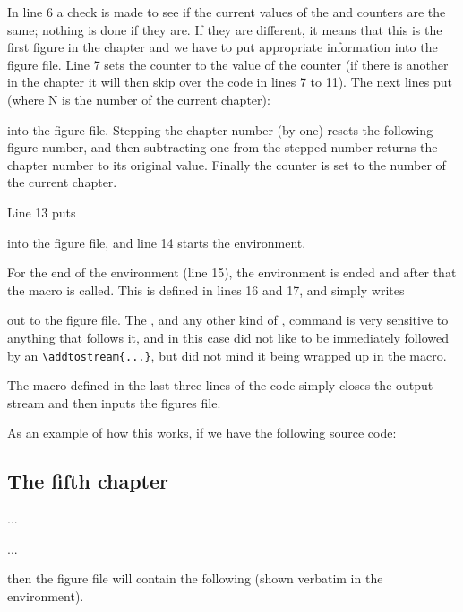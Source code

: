 {{{{    In line 6 a check is made to see if the current values of the 
 and  counters are the same; 
nothing is done if they are. If they are
different, it means that this is the first figure in the chapter and we have
to put appropriate information into the figure file. Line 7 sets the
 counter to the value of the  counter 
(if there is another  in the chapter it will then 
skip over the code in lines 7 to 11).
The next lines put (where N is the number of the current chapter):
\begin{lcode}
\addtocounter{chapter}{-1}
\setcounter{pseudo}{N}
\end{lcode}
into the figure file. Stepping the chapter number (by one) resets the 
following figure number, and then subtracting one from the stepped number
returns the chapter number to its original value. 
Finally the counter  is set to the number of the 
current chapter.

    Line 13 puts
\begin{lcode}
\begin{figure}
\end{lcode}
into the figure file, and line 14 starts the 
 environment.

    For the end of the  environment (line 15), the 
 environment is ended and after that the 
\cmd{\finishwritefigure} macro
is called. This is defined in lines 16 and 17, and simply writes
\begin{lcode}
\end{figure}
\end{lcode}
out to the figure file. The \cmd{\endwriteverbatim}, and any other kind of
, command is very sensitive to anything that follows it,
and in this case did not like to be immediately followed by an
\verb?\addtostream{...}?, but did not mind it being wrapped up in 
the \cmd{\finishwritefigure} macro.

    The \cmd{\printfigures} macro defined in the last three lines of the code
simply closes the output stream and then inputs the 
figures file.

    As an example of how this works, if we have the following source code:
\begin{lcode}
\chapter{The fifth chapter}
...
\begin{writefigure}
\end{writefigure}
...
\begin{writefigure}
\end{writefigure}
\end{lcode}
then the figure file will contain the following (shown verbatim in the 
 environment).

}}}}

